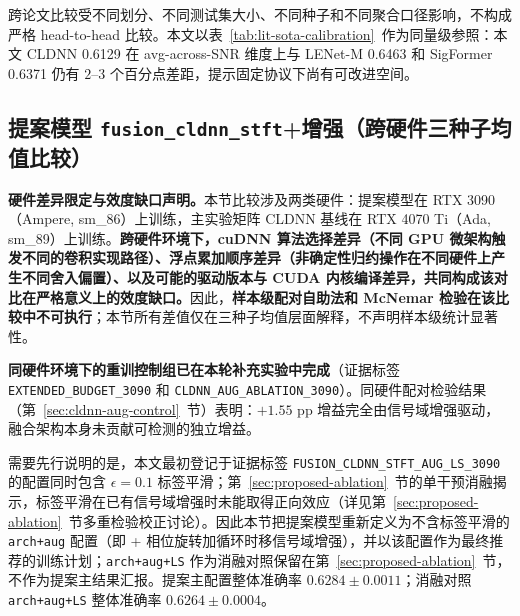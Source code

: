 跨论文比较受不同划分、不同测试集大小、不同种子和不同聚合口径影响，不构成严格 head-to-head 比较。本文以表~\ref{tab:lit-sota-calibration}~作为同量级参照：本文 CLDNN 0.6129 在 avg-across-SNR 维度上与 LENet-M 0.6463 和 SigFormer 0.6371 仍有 \(2\)--\(3\) 个百分点差距，提示固定协议下尚有可改进空间。

\subsection{提案模型 \texttt{fusion\_cldnn\_stft}+增强（跨硬件三种子均值比较）}\label{sec:results-fusion-cldnn-stft}

\textbf{硬件差异限定与效度缺口声明。}本节比较涉及两类硬件：提案模型在 RTX 3090（Ampere, sm\_86）上训练，主实验矩阵 CLDNN 基线在 RTX 4070 Ti（Ada, sm\_89）上训练。\textbf{跨硬件环境下，cuDNN 算法选择差异（不同 GPU 微架构触发不同的卷积实现路径）、浮点累加顺序差异（非确定性归约操作在不同硬件上产生不同舍入偏置）、以及可能的驱动版本与 CUDA 内核编译差异，共同构成该对比在严格意义上的效度缺口。}因此，\textbf{样本级配对自助法和 McNemar 检验在该比较中不可执行}；本节所有差值仅在三种子均值层面解释，不声明样本级统计显著性。

\textbf{同硬件环境下的重训控制组已在本轮补充实验中完成}（证据标签 \texttt{EXTENDED\_BUDGET\_3090} 和 \texttt{CLDNN\_AUG\_ABLATION\_3090}）。同硬件配对检验结果（第~\ref{sec:cldnn-aug-control}~节）表明：$+1.55$ pp 增益完全由信号域增强驱动，融合架构本身未贡献可检测的独立增益。

需要先行说明的是，本文最初登记于证据标签 \texttt{FUSION\_CLDNN\_STFT\_AUG\_LS\_3090} 的配置同时包含 \(\epsilon=0.1\) 标签平滑；第~\ref{sec:proposed-ablation}~节的单干预消融揭示，标签平滑在已有信号域增强时未能取得正向效应（详见第~\ref{sec:proposed-ablation}~节多重检验校正讨论）。因此本节把提案模型重新定义为不含标签平滑的 \texttt{arch+aug} 配置（即  + 相位旋转加循环时移信号域增强），并以该配置作为最终推荐的训练计划；\texttt{arch+aug+LS} 作为消融对照保留在第~\ref{sec:proposed-ablation}~节，不作为提案主结果汇报。提案主配置整体准确率 $0.6284 \pm 0.0011$；消融对照 \texttt{arch+aug+LS} 整体准确率 $0.6264 \pm 0.0004$。

